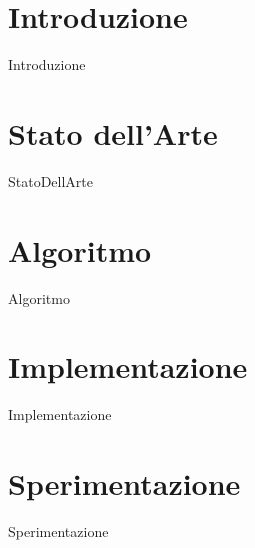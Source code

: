 \documentclass[12pt,oneside]{report}
\begin{document}
 
	                
	\begin{titlepage}
		
	\end{titlepage} 
    
  

	\setcounter{tocdepth}{3}
	\setcounter{secnumdepth}{5}
	
    \tableofcontents{}
    \listoftables
    \newpage
    \chapter{Introduzione}
    {Introduzione}
    \chapter{Stato dell'Arte}
    {StatoDellArte}
    \chapter{Algoritmo}
    {Algoritmo}
	\chapter{Implementazione}
	 {Implementazione}
	\chapter{Sperimentazione}
	 {Sperimentazione}
 
     
    
\end{document}
